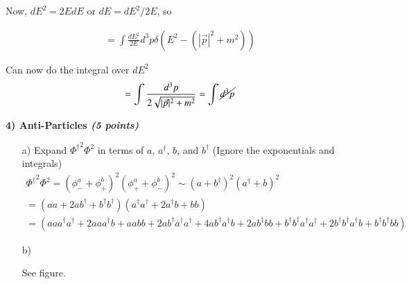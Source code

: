 {Now, $dE^2 = 2E dE$ or $dE = dE^2/2E$, so

\begin{eqnarray*}
 = \int \frac{dE^2}{2E}d^3p \delta(E^2 - (|\vec{p}|^2 + m^2))
\end{eqnarray*}

Can now do the integral over $dE^2$
\begin{eqnarray*}
 = \int \frac{d^3p}{2\sqrt{|\vec{p}|^2 + m^2}}  = \int \cancel{d^3p}
\end{eqnarray*}





\newpage
\textbf{4) Anti-Particles  \hfill \textit{(5 points)}}
\begin{itemize}
\item[a)] {Expand ${\Phi^\dagger}^2 \Phi^2$  in terms of $a$, $a^\dagger$, $b$, and $b^\dagger$  (Ignore the exponentials and integrals)\\

\begin{align*}
{\Phi^\dagger}^2 \Phi^2 = \left(\phi_-^a + \phi_+^b\right)^2 \left(\phi_+^a + \phi_-^b\right)^2 \sim \left(a + b^\dagger \right)^2 \left(a^\dagger + b \right)^2\\
                        =  \left(aa + 2ab^\dagger + b^\dagger b^\dagger \right) \left(a^\dagger a^\dagger + 2 a^\dagger b + bb \right)\\
                        =  \left(aa a^\dagger a^\dagger  + 2 aa a^\dagger b + aabb +  2ab^\dagger a^\dagger a^\dagger + 4 ab^\dagger a^\dagger b + 2ab^\dagger bb  + b^\dagger b^\dagger a^\dagger a^\dagger + 2 b^\dagger b^\dagger a^\dagger b + b^\dagger b^\dagger bb \right) 
\end{align*}
}


\item[b)] {
See figure.

}
\end{itemize}}
